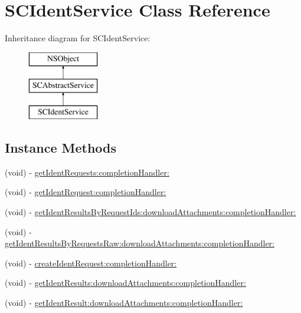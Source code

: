 \hypertarget{interface_s_c_ident_service}{}\section{S\+C\+Ident\+Service Class Reference}
\label{interface_s_c_ident_service}
Inheritance diagram for S\+C\+Ident\+Service\+:\begin{figure}[H]
\begin{center}
\leavevmode
\includegraphics[height=3.000000cm]{interface_s_c_ident_service}
\end{center}
\end{figure}
\subsection*{Instance Methods}
\begin{DoxyCompactItemize}
\item 
(void) -\/ \hyperlink{interface_s_c_ident_service_a645210d9ed41e92c84acd4b0cb4b6276}{get\+Ident\+Requests\+:completion\+Handler\+:}
\item 
(void) -\/ \hyperlink{interface_s_c_ident_service_ad1d6e5701ec285e1711f93eb4438f474}{get\+Ident\+Request\+:completion\+Handler\+:}
\item 
(void) -\/ \hyperlink{interface_s_c_ident_service_a208218e3489135be9ffdf14c7a39c36e}{get\+Ident\+Results\+By\+Request\+Ids\+:download\+Attachments\+:completion\+Handler\+:}
\item 
(void) -\/ \hyperlink{interface_s_c_ident_service_a33c158bf3c84c364101ffa0b63486eca}{get\+Ident\+Results\+By\+Requests\+Raw\+:download\+Attachments\+:completion\+Handler\+:}
\item 
(void) -\/ \hyperlink{interface_s_c_ident_service_a15150e0f89ab1219749a9c61699f1643}{create\+Ident\+Request\+:completion\+Handler\+:}
\item 
(void) -\/ \hyperlink{interface_s_c_ident_service_ae42fb686735d2acf09006f6f77a0d222}{get\+Ident\+Results\+:download\+Attachments\+:completion\+Handler\+:}
\item 
(void) -\/ \hyperlink{interface_s_c_ident_service_ac7970dcec87ed2e6916306e292486ebc}{get\+Ident\+Result\+:download\+Attachments\+:completion\+Handler\+:}
\end{DoxyCompactItemize}
